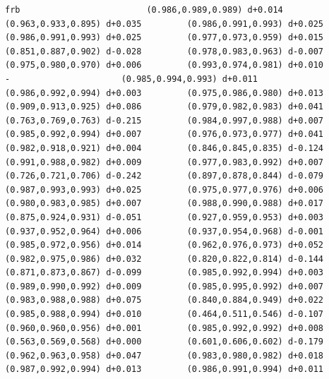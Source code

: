 \documentclass[11pt, letterpaper, openany]{book}
\begin{document}
\begin{empiricalbox}
\begin{lstlisting}[style=terminal]
frb                         (0.986,0.989,0.989) d+0.014         (0.963,0.933,0.895) d+0.035         (0.986,0.991,0.993) d+0.025         (0.986,0.991,0.993) d+0.025         (0.977,0.973,0.959) d+0.015         (0.851,0.887,0.902) d-0.028         (0.978,0.983,0.963) d-0.007         (0.975,0.980,0.970) d+0.006         (0.993,0.974,0.981) d+0.010                      -                      (0.985,0.994,0.993) d+0.011         (0.986,0.992,0.994) d+0.003         (0.975,0.986,0.980) d+0.013         (0.909,0.913,0.925) d+0.086         (0.979,0.982,0.983) d+0.041         (0.763,0.769,0.763) d-0.215         (0.984,0.997,0.988) d+0.007         (0.985,0.992,0.994) d+0.007         (0.976,0.973,0.977) d+0.041         (0.982,0.918,0.921) d+0.004         (0.846,0.845,0.835) d-0.124         (0.991,0.988,0.982) d+0.009         (0.977,0.983,0.992) d+0.007         (0.726,0.721,0.706) d-0.242         (0.897,0.878,0.844) d-0.079         (0.987,0.993,0.993) d+0.025         (0.975,0.977,0.976) d+0.006         (0.980,0.983,0.985) d+0.007         (0.988,0.990,0.988) d+0.017         (0.875,0.924,0.931) d-0.051         (0.927,0.959,0.953) d+0.003         (0.937,0.952,0.964) d+0.006         (0.937,0.954,0.968) d-0.001         (0.985,0.972,0.956) d+0.014         (0.962,0.976,0.973) d+0.052         (0.982,0.975,0.986) d+0.032         (0.820,0.822,0.814) d-0.144         (0.871,0.873,0.867) d-0.099         (0.985,0.992,0.994) d+0.003         (0.989,0.990,0.992) d+0.009         (0.985,0.995,0.992) d+0.007         (0.983,0.988,0.988) d+0.075         (0.840,0.884,0.949) d+0.022         (0.985,0.988,0.994) d+0.010         (0.464,0.511,0.546) d-0.107         (0.960,0.960,0.956) d+0.001         (0.985,0.992,0.992) d+0.008         (0.563,0.569,0.568) d+0.000         (0.601,0.606,0.602) d-0.179         (0.962,0.963,0.958) d+0.047         (0.983,0.980,0.982) d+0.018         (0.987,0.992,0.994) d+0.013         (0.986,0.991,0.994) d+0.011     

\end{lstlisting}
\end{empiricalbox}
\end{document}
